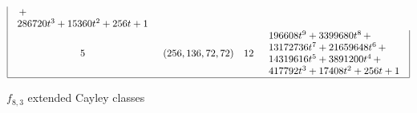\documentclass[12pt,a4paper]{article}
\begin{document}
\begin{table}[!bhpt]
\begin{align*}
\begin{array}{|cccl|}
\begin{array}{l}
\,+
\\
 286720t^{3} + 15360t^{2} + 256t + 1
\end{array}
\\
5 &
(256, 136, 72, 72) &
12 &
\begin{array}{l}
196608t^{9} + 3399680t^{8}
\,+
\\
 13172736t^{7} + 21659648t^{6}
\,+
\\
 14319616t^{5} + 3891200t^{4}
\,+
\\
 417792t^{3} + 17408t^{2} + 256t + 1
\end{array}
\\
\hline
\end{array}
\end{align*}
\caption{$f_{8,3}$ extended Cayley classes}
\label{tab-c8_3_EC_classes}
\end{table}
\end{document}
